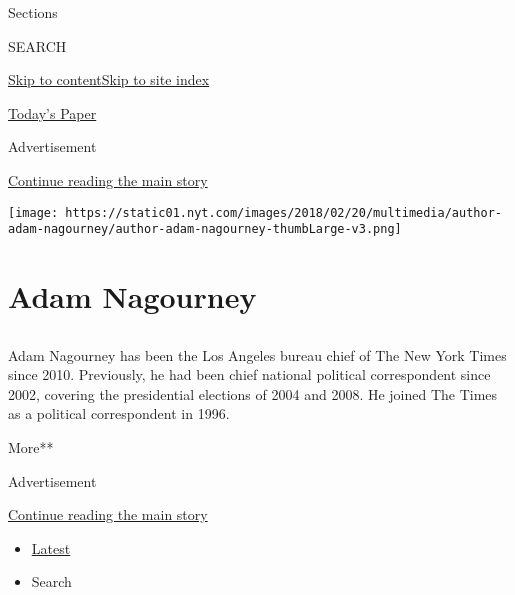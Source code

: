 Sections

SEARCH

\protect\hyperlink{site-content}{Skip to
content}\protect\hyperlink{site-index}{Skip to site index}

\href{https://myaccount.nytimes.com/auth/login?response_type=cookie\&client_id=vi}{}

\href{https://www.nytimes.com/section/todayspaper}{Today's Paper}

Advertisement

\protect\hyperlink{after-top}{Continue reading the main story}

\texttt{[image: https://static01.nyt.com/images/2018/02/20/multimedia/author-adam-nagourney/author-adam-nagourney-thumbLarge-v3.png]}

\hypertarget{adam-nagourney}{%
\section{Adam Nagourney}\label{adam-nagourney}}

\subsection{}

Adam Nagourney has been the Los Angeles bureau chief of The New York
Times since 2010. Previously, he had been chief national political
correspondent since 2002, covering the presidential elections of 2004
and 2008. He joined The Times as a political correspondent in 1996.

More**

Advertisement

\protect\hyperlink{after-mid1}{Continue reading the main story}

\begin{itemize}
\tightlist
\item
  \protect\hyperlink{stream-panel}{Latest}
\item
  Search
\end{itemize}

